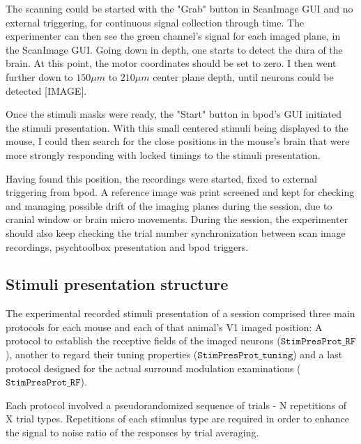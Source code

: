 The scanning could be started with the "Grab" button in ScanImage GUI and no external triggering, for continuous signal collection through time. The experimenter can then see the green channel's signal for each imaged plane, in the ScanImage GUI. Going down in depth, one starts to detect the dura of the brain. At this point, the motor coordinates should be set to zero. 
I then went further down to $150 \mu m$ to $210 \mu m$ center plane depth, until neurons could be detected [IMAGE]. 

Once the stimuli masks were ready, the "Start" button in bpod's GUI initiated the stimuli presentation. With this small centered stimuli being displayed to the mouse, I could then search for the close positions in the mouse's brain that were more strongly responding with locked timings to the stimuli presentation. 

Having found this position, the recordings were started, fixed to external triggering from bpod. A reference image was print screened and kept for checking and managing possible drift of the imaging planes during the session, due to cranial window or brain micro movements. During the session, the experimenter should also keep checking the trial number synchronization between scan image recordings, psychtoolbox presentation and bpod triggers.


\subsection{Stimuli presentation structure}

The experimental recorded stimuli presentation of a session comprised three main protocols for each mouse and each of that animal's V1 imaged position: A protocol to establish the receptive fields of the imaged neurons ($\texttt{StimPresProt\_RF}$), another to regard their tuning properties ($\texttt{StimPresProt\_tuning}$) and a last protocol designed for the actual surround modulation examinations ($\texttt{StimPresProt\_RF}$). 

Each protocol involved a pseudorandomized sequence of trials - N repetitions of X trial types. Repetitions of each stimulus type are required in order to enhance the signal to noise ratio of the responses by trial averaging. 

